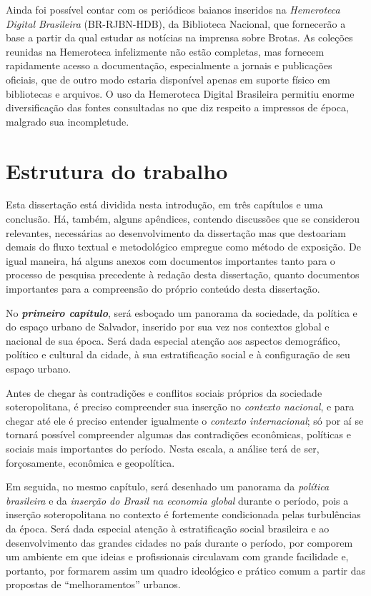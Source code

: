 Ainda foi possível contar com os periódicos baianos inseridos na \textit{Hemeroteca Digital Brasileira} (BR-RJBN-HDB), da Biblioteca Nacional, que fornecerão a base a partir da qual estudar as notícias na imprensa sobre Brotas. As coleções reunidas na Hemeroteca infelizmente não estão completas, mas fornecem rapidamente acesso a documentação, especialmente a jornais e publicações oficiais, que de outro modo estaria disponível apenas em suporte físico em bibliotecas e arquivos. O uso da Hemeroteca Digital Brasileira permitiu enorme diversificação das fontes consultadas no que diz respeito a impressos de época, malgrado sua incompletude.

\section{Estrutura do trabalho}\label{sec:estrutrab}

Esta dissertação está dividida nesta introdução, em três capítulos e uma conclusão. Há, também, alguns apêndices, contendo discussões que se considerou relevantes, necessárias ao desenvolvimento da dissertação mas que destoariam demais do fluxo textual e metodológico empregue como método de exposição. De igual maneira, há alguns anexos com documentos importantes tanto para o processo de pesquisa precedente à redação desta dissertação, quanto documentos importantes para a compreensão do próprio conteúdo desta dissertação.

No \textbf{\textit{primeiro capítulo}}, será esboçado um panorama da sociedade, da política e do espaço urbano de Salvador, inserido por sua vez nos contextos global e nacional de sua época. Será dada especial atenção aos aspectos demográfico, político e cultural da cidade, à sua estratificação social e à configuração de seu espaço urbano. 

Antes de chegar às contradições e conflitos sociais próprios da sociedade soteropolitana, é preciso compreender sua inserção no \textit{contexto nacional}, e para chegar até ele é preciso entender igualmente o \textit{contexto internacional}; só por aí se tornará possível compreender algumas das contradições econômicas, políticas e sociais mais importantes do período. Nesta escala, a análise terá de ser, forçosamente, econômica e geopolítica. 

Em seguida, no mesmo capítulo, será desenhado um panorama da \textit{política brasileira} e da \textit{inserção do Brasil na economia global} durante o período, pois a inserção soteropolitana no contexto é fortemente condicionada pelas turbulências da época. Será dada especial atenção à estratificação social brasileira e ao desenvolvimento das grandes cidades no país durante o período, por comporem um ambiente em que ideias e profissionais circulavam com grande facilidade e, portanto, por formarem assim um quadro ideológico e prático comum a partir das propostas de ``melhoramentos'' urbanos. 

